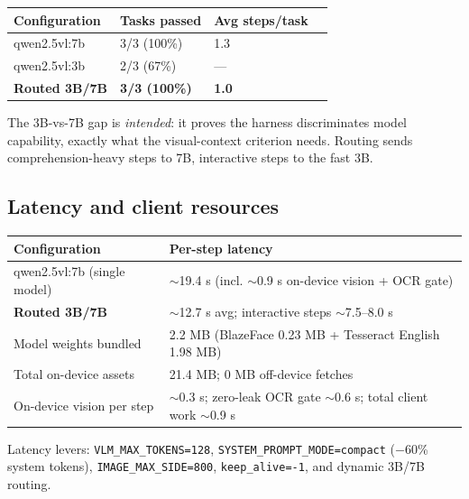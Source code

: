 \documentclass[11pt,a4paper]{article}
\newcommand{\code}[1]{\texttt{#1}}
\renewcommand{\arraystretch}{1.25}
\begin{document}
\begin{itemize}
\begin{table}[H]
\small
\renewcommand{\arraystretch}{1.3}
\begin{tabularx}{\linewidth}{@{}lXXX@{}}
\toprule
\textbf{Configuration} & \textbf{Tasks passed} & \textbf{Avg steps/task} \\
\midrule
qwen2.5vl:7b & 3/3 (100\%) & 1.3 \\
qwen2.5vl:3b & 2/3 (67\%) & --- \\
\textbf{Routed 3B/7B} & \textbf{3/3 (100\%)} & \textbf{1.0} \\
\bottomrule
\end{tabularx}
\end{table}

The 3B-vs-7B gap is \emph{intended}: it proves the harness discriminates model capability, exactly what the visual-context criterion needs. Routing sends comprehension-heavy steps to 7B, interactive steps to the fast 3B.

\subsection{Latency and client resources}

\begin{table}[H]
\small
\renewcommand{\arraystretch}{1.3}
\begin{tabularx}{\linewidth}{@{}lX@{}}
\toprule
\textbf{Configuration} & \textbf{Per-step latency} \\
\midrule
qwen2.5vl:7b (single model) & $\sim$19.4 s (incl. $\sim$0.9 s on-device vision + OCR gate) \\
\textbf{Routed 3B/7B} & $\sim$12.7 s avg; interactive steps $\sim$7.5--8.0 s \\
\midrule
Model weights bundled & 2.2 MB (BlazeFace 0.23 MB + Tesseract English 1.98 MB) \\
Total on-device assets & 21.4 MB; 0 MB off-device fetches \\
On-device vision per step & $\sim$0.3 s; zero-leak OCR gate $\sim$0.6 s; total client work $\sim$0.9 s \\
\bottomrule
\end{tabularx}
\end{table}

Latency levers: \code{VLM\_MAX\_TOKENS=128}, \code{SYSTEM\_PROMPT\_MODE=compact} ($-$60\% system tokens), \code{IMAGE\_MAX\_SIDE=800}, \code{keep\_alive=-1}, and dynamic 3B/7B routing.


\end{itemize}
\end{document}

